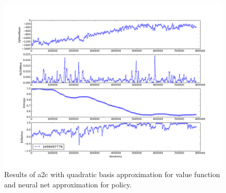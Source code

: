 \documentclass{article}[11pt]
\begin{document}
 \begin{figure}[H]
  \begin{center}
    \includegraphics[width=1.4\linewidth]{images/plot}
    \caption{ Results of a2c with quadratic basis approximation for value function and neural net approximation for policy.}
    \label{fig:5grid}
  \end{center}
\end{figure}





\end{document}
